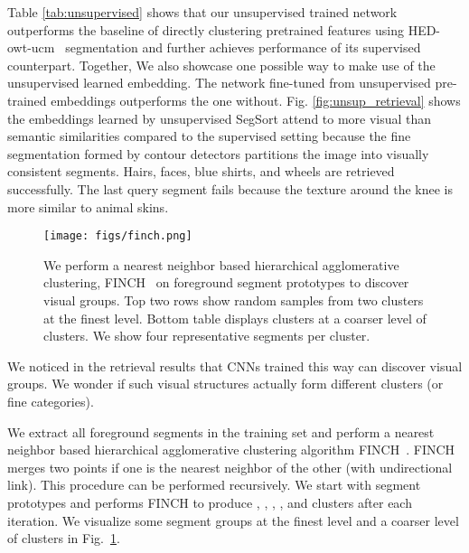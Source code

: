 \documentclass[10pt,twocolumn,letterpaper]{article}
\begin{document}
Table \ref{tab:unsupervised} shows that our unsupervised trained network outperforms the baseline of directly clustering pretrained features using HED-owt-ucm~\cite{xie2015holistically} segmentation and further achieves  performance of its supervised counterpart. Together, We also showcase one possible way to make use of the unsupervised learned embedding. The network fine-tuned from unsupervised pre-trained embeddings outperforms the one without. 
Fig. \ref{fig:unsup_retrieval} shows the embeddings learned by unsupervised SegSort attend to more visual than semantic similarities compared to the supervised setting because the fine segmentation formed by contour detectors partitions the image into visually consistent segments. Hairs, faces, blue shirts, and wheels are retrieved successfully. The last query segment fails because the texture around the knee is more similar to animal skins. \\




\begin{figure}
    \centering
    \texttt{[image: figs/finch.png]}
    \caption{We perform a nearest neighbor based hierarchical agglomerative clustering, FINCH~\cite{sarfraz2019efficient} on foreground segment prototypes to discover visual groups. Top two rows show random samples from two clusters at the finest level. Bottom table displays clusters at a coarser level of  clusters. We show four representative segments per cluster. }
    \label{fig:finch}
    \vspace{-6pt}
\end{figure}


\vspace{-6pt}
We noticed in the retrieval results that CNNs trained this way can discover visual groups.
We wonder if such visual structures actually form different clusters (or fine categories).


We extract all foreground segments in the training set and perform a nearest neighbor based hierarchical agglomerative clustering algorithm FINCH~\cite{sarfraz2019efficient}.
FINCH merges two points if one is the nearest neighbor of the other (with undirectional link).
This procedure can be performed recursively.
We start with  segment prototypes and performs FINCH to produce , , , , and  clusters after each iteration.
We visualize some segment groups at the finest level and a coarser level of  clusters in Fig.~\ref{fig:finch}.
\end{document}
